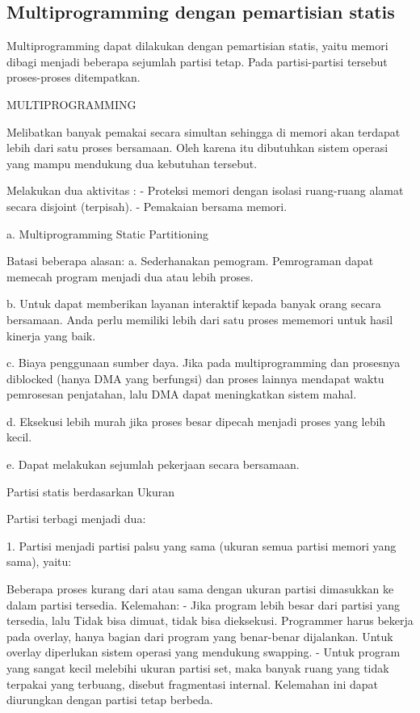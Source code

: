 \subsection {Multiprogramming dengan pemartisian statis}
Multiprogramming dapat dilakukan dengan pemartisian statis, yaitu memori dibagi menjadi beberapa sejumlah partisi tetap. Pada partisi-partisi tersebut proses-proses ditempatkan.


	MULTIPROGRAMMING

	Melibatkan banyak pemakai secara simultan sehingga di memori akan terdapat lebih dari satu proses bersamaan. Oleh karena itu dibutuhkan sistem operasi yang mampu mendukung dua kebutuhan tersebut.

	Melakukan dua aktivitas :
	- Proteksi memori dengan isolasi ruang-ruang alamat secara disjoint (terpisah).
	- Pemakaian bersama memori.

a. Multiprogramming Static Partitioning

	Batasi beberapa alasan:
	a. Sederhanakan pemogram.
	Pemrograman dapat memecah program menjadi dua atau lebih proses.

	b. Untuk dapat memberikan layanan interaktif kepada banyak orang secara bersamaan. Anda perlu memiliki lebih dari satu proses mememori untuk hasil kinerja yang baik.

	c. Biaya penggunaan sumber daya.
	Jika pada multiprogramming dan prosesnya diblocked (hanya DMA yang berfungsi) dan proses lainnya mendapat waktu pemrosesan penjatahan, lalu DMA dapat meningkatkan sistem mahal.

	d. Eksekusi lebih murah jika proses besar dipecah menjadi proses yang lebih kecil.

	e. Dapat melakukan sejumlah pekerjaan secara bersamaan.


Partisi statis berdasarkan Ukuran

Partisi terbagi menjadi dua:

1. Partisi menjadi partisi palsu yang sama (ukuran semua partisi
memori yang sama), yaitu:

Beberapa proses kurang dari atau sama dengan ukuran partisi dimasukkan ke dalam partisi tersedia.
Kelemahan:
	- Jika program lebih besar dari partisi yang tersedia, lalu Tidak bisa dimuat, tidak bisa dieksekusi. Programmer harus bekerja pada overlay, hanya bagian dari program yang benar-benar dijalankan. Untuk overlay diperlukan sistem operasi yang mendukung swapping.
	- Untuk program yang sangat kecil melebihi ukuran partisi set, maka banyak ruang yang tidak terpakai yang terbuang, disebut fragmentasi internal. Kelemahan ini dapat diurungkan dengan partisi tetap berbeda.

